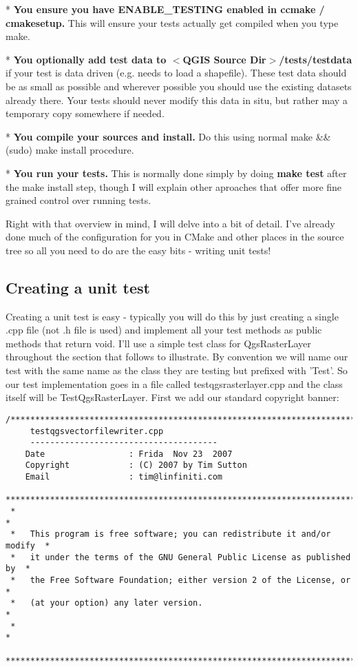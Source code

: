  * \textbf{You ensure you have ENABLE\_TESTING enabled in ccmake / cmakesetup.} This 
   will ensure your tests actually get compiled when you type make.

 * \textbf{You optionally add test data to $<$QGIS Source Dir$>$/tests/testdata} if your 
   test is data driven (e.g. needs to load a shapefile). These test data should be 
   as small as possible and wherever possible you should use the existing datasets 
   already there. Your tests should never modify this data in situ, but rather 
   may a temporary copy somewhere if needed.

 * \textbf{You compile your sources and install.} Do this using normal make \&\& (sudo) 
   make install procedure.

 * \textbf{You run your tests.} This is normally done simply by doing \textbf{make test} 
 after the make install step, though I will explain other aproaches that offer more 
 fine grained control over running tests.

Right with that overview in mind, I will delve into a bit of detail. I've already 
done much of the configuration for you in CMake and other places in the source tree 
so all you need to do are the easy bits - writing unit tests!

\subsection{Creating a unit test}
Creating a unit test is easy - typically you will do this by just creating a 
single .cpp file (not .h file is used) and implement all your test methods as
public methods that return void. I'll use a simple test class for QgsRasterLayer 
throughout the section that follows to illustrate. By convention we will name our 
test with the same name as the class they are testing but prefixed with 'Test'.
So our test implementation goes in a file called testqgsrasterlayer.cpp and 
the class itself will be TestQgsRasterLayer. First we add our standard copyright 
banner:

\begin{verbatim}
/***************************************************************************
     testqgsvectorfilewriter.cpp
     --------------------------------------
    Date                 : Frida  Nov 23  2007
    Copyright            : (C) 2007 by Tim Sutton
    Email                : tim@linfiniti.com
 ***************************************************************************
 *                                                                         *
 *   This program is free software; you can redistribute it and/or modify  *
 *   it under the terms of the GNU General Public License as published by  *
 *   the Free Software Foundation; either version 2 of the License, or     *
 *   (at your option) any later version.                                   *
 *                                                                         *
 ***************************************************************************/
\end{verbatim}

